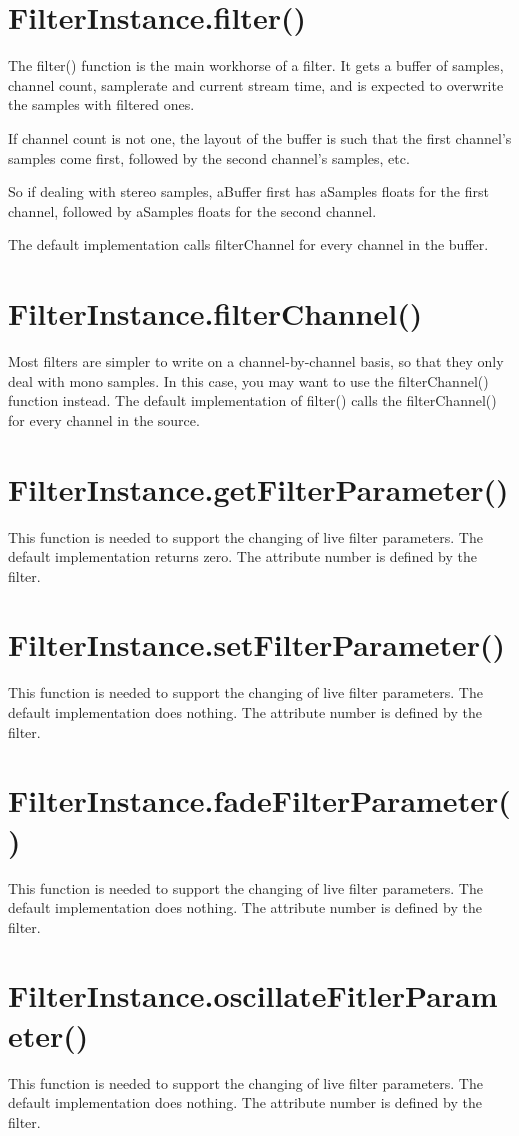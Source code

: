\section{FilterInstance.filter()}

The filter() function is the main workhorse of a filter. It gets a buffer of samples, channel count, samplerate and current stream time, and is expected to overwrite the samples with filtered ones.

If channel count is not one, the layout of the buffer is such that the first channel's samples come first, followed by the second channel's samples, etc.

So if dealing with stereo samples, aBuffer first has aSamples floats for the first channel, followed by aSamples floats for the second channel.

The default implementation calls filterChannel for every channel in the buffer.

\section{FilterInstance.filterChannel()}

Most filters are simpler to write on a channel-by-channel basis, so that they only deal with mono samples. In this case, you may want to use the filterChannel() function instead. The default implementation of filter() calls the filterChannel() for every channel in the source.

\section{FilterInstance.getFilterParameter()}

This function is needed to support the changing of live filter parameters. The default implementation returns zero. The attribute number is defined by the filter.

\section{FilterInstance.setFilterParameter()}

This function is needed to support the changing of live filter parameters. The default implementation does nothing. The attribute number is defined by the filter.

\section{FilterInstance.fadeFilterParameter()}

This function is needed to support the changing of live filter parameters. The default implementation does nothing. The attribute number is defined by the filter.

\section{FilterInstance.oscillateFitlerParameter()}

This function is needed to support the changing of live filter parameters. The default implementation does nothing. The attribute number is defined by the filter.




